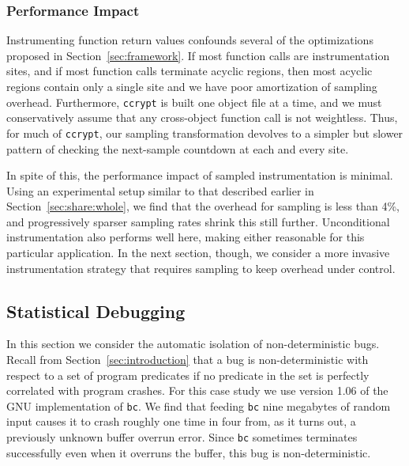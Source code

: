 \subsubsection{Performance Impact}

Instrumenting function return values confounds several of the
optimizations proposed in Section~\ref{sec:framework}.  If most
function calls are instrumentation sites, and if most function calls
terminate acyclic regions, then most acyclic regions contain only a
single site and we have poor amortization of sampling overhead.
Furthermore, \texttt{ccrypt} is built one object file at a time, and
we must conservatively assume that any cross-object function call is
not weightless.  Thus, for much of \texttt{ccrypt}, our sampling
transformation devolves to a simpler but slower pattern of checking
the next-sample countdown at each and every site.


In spite of this, the performance impact of sampled instrumentation is
minimal.  Using an experimental setup similar to that described
earlier in Section~\ref{sec:share:whole}, we find that the overhead
for  sampling is less than 4\%, and progressively
sparser sampling rates shrink this still further.  Unconditional
instrumentation also performs well here, making either reasonable for
this particular application.  In the next section, though, we consider
a more invasive instrumentation strategy that requires sampling to
keep overhead under control.

\subsection{Statistical Debugging}
\label{sec:bc}

In this section we consider the automatic isolation of non-deterministic
bugs.  Recall from Section~\ref{sec:introduction} that a bug is
non-deterministic with respect to a set of program predicates if no predicate
in the set is perfectly correlated with program crashes.  
For this case study we use version 1.06 of the GNU implementation of
\texttt{bc}.  We find that feeding \texttt{bc} nine megabytes of
random input causes it to crash roughly one time in four from, as it
turns out, a previously unknown buffer overrun error.  Since \texttt{bc}
sometimes terminates successfully even when it overruns the buffer,
this bug is non-deterministic.

